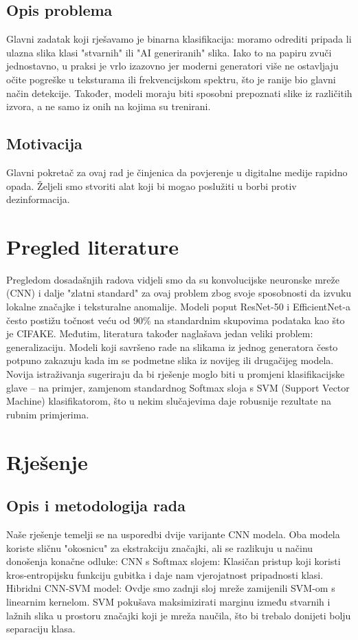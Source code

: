 \documentclass[conference]{IEEEtran}
\begin{document}
\subsection{Opis problema}Glavni zadatak koji rješavamo je binarna klasifikacija: moramo odrediti pripada li ulazna slika klasi "stvarnih" ili "AI generiranih" slika. Iako to na papiru zvuči jednostavno, u praksi je vrlo izazovno jer moderni generatori više ne ostavljaju očite pogreške u teksturama ili frekvencijskom spektru, što je ranije bio glavni način detekcije. Također, modeli moraju biti sposobni prepoznati slike iz različitih izvora, a ne samo iz onih na kojima su trenirani.

\subsection{Motivacija}Glavni pokretač za ovaj rad je činjenica da povjerenje u digitalne medije rapidno opada. Željeli smo stvoriti alat koji bi mogao poslužiti u borbi protiv dezinformacija.

\section{Pregled literature}
\label{sect:litrev}
Pregledom dosadašnjih radova vidjeli smo da su konvolucijske neuronske mreže (CNN) i dalje "zlatni standard" za ovaj problem zbog svoje sposobnosti da izvuku lokalne značajke i teksturalne anomalije. Modeli poput ResNet-50 i EfficientNet-a često postižu točnost veću od 90\% na standardnim skupovima podataka kao što je CIFAKE. Međutim, literatura također naglašava jedan veliki problem: generalizaciju. Modeli koji savršeno rade na slikama iz jednog generatora često potpuno zakazuju kada im se podmetne slika iz novijeg ili drugačijeg modela. Novija istraživanja sugeriraju da bi rješenje moglo biti u promjeni klasifikacijske glave – na primjer, zamjenom standardnog Softmax sloja s SVM (Support Vector Machine) klasifikatorom, što u nekim slučajevima daje robusnije rezultate na rubnim primjerima.

\section{Rješenje}

\subsection{Opis i metodologija rada}
\label{sect:metoda}
Naše rješenje temelji se na usporedbi dvije varijante CNN modela. Oba modela koriste sličnu "okosnicu" za ekstrakciju značajki, ali se razlikuju u načinu donošenja konačne odluke:
CNN s Softmax slojem: Klasičan pristup koji koristi kros-entropijsku funkciju gubitka i daje nam vjerojatnost pripadnosti klasi.
Hibridni CNN-SVM model: Ovdje smo zadnji sloj mreže zamijenili SVM-om s linearnim kernelom. SVM pokušava maksimizirati marginu između stvarnih i lažnih slika u prostoru značajki koji je mreža naučila, što bi trebalo donijeti bolju separaciju klasa.
\end{document}
